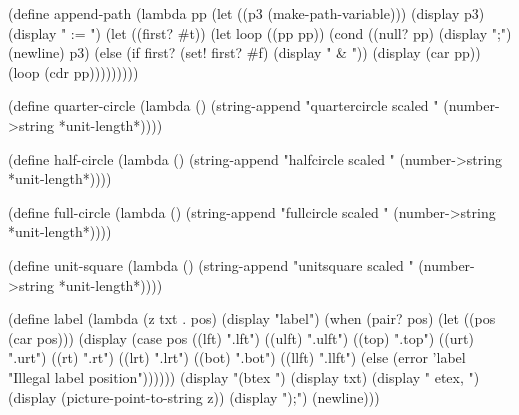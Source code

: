 {(define append-path
  (lambda pp 
    (let ((p3 (make-path-variable)))
      (display p3) (display " := ")
      (let ((first? #t))
        (let loop ((pp pp))
          (cond ((null? pp) (display ";") (newline)
                            p3)
                (else (if first? (set! first? #f)
                          (display " & "))
                      (display (car pp))
                      (loop (cdr pp)))))))))


(define quarter-circle
  (lambda ()
    (string-append "quartercircle scaled "
                   (number->string *unit-length*))))

(define half-circle
  (lambda ()
    (string-append "halfcircle scaled "
                   (number->string *unit-length*))))

(define full-circle
  (lambda ()
    (string-append "fullcircle scaled "
                   (number->string *unit-length*))))

(define unit-square
  (lambda ()
    (string-append "unitsquare scaled "
                   (number->string *unit-length*))))

(define label
  (lambda (z txt . pos)
    (display "label")
    (when (pair? pos)
      (let ((pos (car pos)))
        (display
          (case pos
            ((lft) ".lft") ((ulft) ".ulft") ((top) ".top")
            ((urt) ".urt") ((rt) ".rt") ((lrt) ".lrt")
            ((bot) ".bot") ((llft) ".llft")
            (else (error 'label "Illegal label position"))))))
    (display "(btex ") (display txt) (display " etex, ")
    (display (picture-point-to-string z))
    (display ");")
    (newline)))

}
